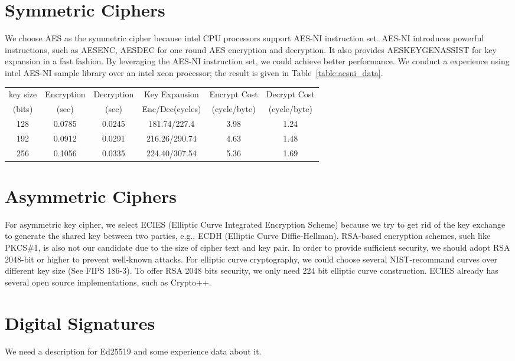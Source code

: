 \section{Symmetric Ciphers}
We choose AES as the symmetric cipher because intel CPU processors support
AES-NI instruction set. AES-NI introduces powerful instructions, such as AESENC,
AESDEC for one round AES encryption and decryption. It also provides AESKEYGENASSIST
for key expansion in a fast fashion. By leveraging the AES-NI instruction set, we could
achieve better performance. We conduct a experience using intel AES-NI sample library
over an intel xeon processor; the result is given in Table~\ref{table:aesni_data}.

\begin{table*}[tb]
\centering
\caption{AES performance test over Intel Xeon E5640 Processor. We performed
AES CBC encryption/decryption on a 50MB file over multiple loops, 100 times.}
\label{table:aesni_data}
\begin{tabular}{|c|c|c|c|c|c|} \hline
key size  & Encryption & Decryption& Key Expansion & Encrypt Cost & Decrypt Cost\\ 
(bits)  & (sec) & (sec) & Enc/Dec(cycles) &  (cycle/byte)  & (cycle/byte) \\  \hline
128  &0.0785 & 0.0245 & 181.74/227.4 & 3.98 & 1.24 \\  \hline
192  &0.0912 & 0.0291 & 216.26/290.74 & 4.63 & 1.48 \\  \hline
256  &0.1056 & 0.0335 & 224.40/307.54 & 5.36 & 1.69 \\  \hline
\end{tabular}
\end{table*}

\section{Asymmetric Ciphers}
For asymmetric key cipher, we select ECIES (Elliptic Curve Integrated Encryption Scheme)
because we try to get rid of the key exchange to generate the shared key between two parties,
e.g., ECDH (Elliptic Curve Diffie-Hellman). RSA-based encryption schemes, such like PKCS\#1, is
also not our candidate due to the size of cipher text and key pair. In order to provide
sufficient security, we should adopt RSA 2048-bit or higher to prevent well-known attacks.
For elliptic curve cryptography, we could choose several NIST-recommand curves over different
key size (See FIPS 186-3). To offer RSA 2048 bits security, we only need 224 bit elliptic curve
construction. ECIES already has several open source implementations, such as Crypto++.

\section{Digital Signatures}
We need a description for Ed25519 and some experience data about it.
